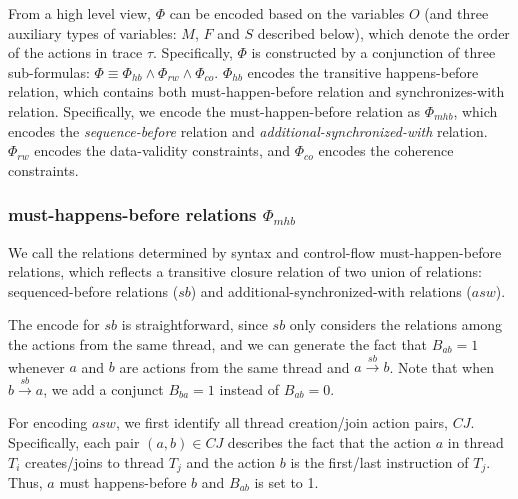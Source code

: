 \documentclass[preprint, numbers, 10pt]{sigplanconf}
\begin{document}

From a high level view, $\Phi$ can be encoded based on the variables $O$
(and three auxiliary types of variables: $M$, $F$ and $S$ described below), 
which denote the order of the actions in trace $\tau$. 
Specifically, $\Phi$ is constructed by a 
conjunction of three sub-formulas: $\Phi\equiv\Phi_{hb}\wedge\Phi_{rw}\wedge\Phi_{co}$.
$\Phi_{hb}$ encodes the transitive happens-before relation, which contains both
must-happen-before relation and synchronizes-with relation. Specifically, we encode
the must-happen-before relation as $\Phi_{mhb}$, which encodes the \textit{sequence-before} 
relation and \textit{additional-synchronized-with} relation.
$\Phi_{rw}$ encodes the data-validity constraints, %
and $\Phi_{co}$ encodes the coherence constraints. 


\subsubsection{must-happens-before relations $\Phi_{mhb}$}

We call the relations determined by syntax and control-flow must-happen-before relations,
which reflects a transitive closure relation of two union of relations: sequenced-before
relations ($sb$) and additional-synchronized-with relations ($asw$). 

The encode for $sb$ is straightforward, since $sb$ only 
considers the relations among the actions from the same thread, and 
we can generate the fact that $B_{ab}=1$ whenever 
$a$ and $b$ are actions from the same thread and $a \stackrel{sb}{\longrightarrow} b$. 
Note that when $b \stackrel{sb}{\longrightarrow} a$, we add a conjunct $B_{ba}=1$ instead of
$B_{ab}=0$. 

For encoding $asw$, we first identify all thread creation/join action pairs, $CJ$.
Specifically, each pair $(a,b)\in CJ$ describes the fact that the action $a$ in thread $T_i$ creates/joins to 
thread $T_j$ and the action $b$ is the first/last instruction of $T_j$. Thus,
$a$ must happens-before $b$ and $B_{ab}$ is set to 1.
\end{document}
